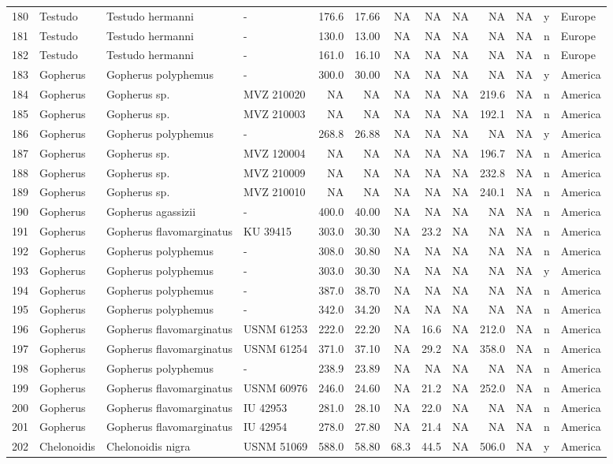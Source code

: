 \documentclass[]{article}
\begin{document}
\begin{longtable}[]{@{}llllrrrrrrlll@{}}
180 & Testudo & Testudo hermanni & - & 176.6 & 17.66 & NA & NA & NA & NA
& NA & y & Europe\tabularnewline
181 & Testudo & Testudo hermanni & - & 130.0 & 13.00 & NA & NA & NA & NA
& NA & n & Europe\tabularnewline
182 & Testudo & Testudo hermanni & - & 161.0 & 16.10 & NA & NA & NA & NA
& NA & n & Europe\tabularnewline
183 & Gopherus & Gopherus polyphemus & - & 300.0 & 30.00 & NA & NA & NA
& NA & NA & y & America\tabularnewline
184 & Gopherus & Gopherus sp. & MVZ 210020 & NA & NA & NA & NA & NA &
219.6 & NA & n & America\tabularnewline
185 & Gopherus & Gopherus sp. & MVZ 210003 & NA & NA & NA & NA & NA &
192.1 & NA & n & America\tabularnewline
186 & Gopherus & Gopherus polyphemus & - & 268.8 & 26.88 & NA & NA & NA
& NA & NA & y & America\tabularnewline
187 & Gopherus & Gopherus sp. & MVZ 120004 & NA & NA & NA & NA & NA &
196.7 & NA & n & America\tabularnewline
188 & Gopherus & Gopherus sp. & MVZ 210009 & NA & NA & NA & NA & NA &
232.8 & NA & n & America\tabularnewline
189 & Gopherus & Gopherus sp. & MVZ 210010 & NA & NA & NA & NA & NA &
240.1 & NA & n & America\tabularnewline
190 & Gopherus & Gopherus agassizii & - & 400.0 & 40.00 & NA & NA & NA &
NA & NA & n & America\tabularnewline
191 & Gopherus & Gopherus flavomarginatus & KU 39415 & 303.0 & 30.30 &
NA & 23.2 & NA & NA & NA & n & America\tabularnewline
192 & Gopherus & Gopherus polyphemus & - & 308.0 & 30.80 & NA & NA & NA
& NA & NA & n & America\tabularnewline
193 & Gopherus & Gopherus polyphemus & - & 303.0 & 30.30 & NA & NA & NA
& NA & NA & y & America\tabularnewline
194 & Gopherus & Gopherus polyphemus & - & 387.0 & 38.70 & NA & NA & NA
& NA & NA & n & America\tabularnewline
195 & Gopherus & Gopherus polyphemus & - & 342.0 & 34.20 & NA & NA & NA
& NA & NA & n & America\tabularnewline
196 & Gopherus & Gopherus flavomarginatus & USNM 61253 & 222.0 & 22.20 &
NA & 16.6 & NA & 212.0 & NA & n & America\tabularnewline
197 & Gopherus & Gopherus flavomarginatus & USNM 61254 & 371.0 & 37.10 &
NA & 29.2 & NA & 358.0 & NA & n & America\tabularnewline
198 & Gopherus & Gopherus polyphemus & - & 238.9 & 23.89 & NA & NA & NA
& NA & NA & n & America\tabularnewline
199 & Gopherus & Gopherus flavomarginatus & USNM 60976 & 246.0 & 24.60 &
NA & 21.2 & NA & 252.0 & NA & n & America\tabularnewline
200 & Gopherus & Gopherus flavomarginatus & IU 42953 & 281.0 & 28.10 &
NA & 22.0 & NA & NA & NA & n & America\tabularnewline
201 & Gopherus & Gopherus flavomarginatus & IU 42954 & 278.0 & 27.80 &
NA & 21.4 & NA & NA & NA & n & America\tabularnewline
202 & Chelonoidis & Chelonoidis nigra & USNM 51069 & 588.0 & 58.80 &
68.3 & 44.5 & NA & 506.0 & NA & y & America\tabularnewline

\end{longtable}
\end{document}
